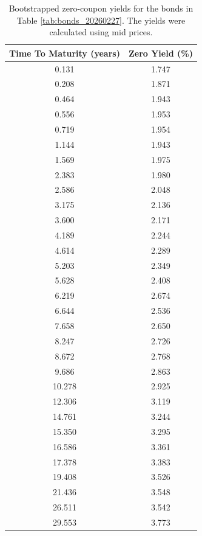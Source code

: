 \documentclass[a4paper]{artikel3}
\numberwithin{equation}{section}
\numberwithin{theorem}{section}
\numberwithin{proposition}{section}
\numberwithin{lemma}{section}
\begin{document}
\begin{table}[h!]
    \centering
    \begin{tabular}{| c | c |} 
\hline
Time To Maturity (years) & Zero Yield (\%) \\
\hline
\hline
0.131 & 1.747 \\
\hline
0.208 & 1.871 \\
\hline
0.464 & 1.943 \\
\hline
0.556 & 1.953 \\
\hline
0.719 & 1.954 \\
\hline
1.144 & 1.943 \\
\hline
1.569 & 1.975 \\
\hline
2.383 & 1.980 \\
\hline
2.586 & 2.048 \\
\hline
3.175 & 2.136 \\
\hline
3.600 & 2.171 \\
\hline
4.189 & 2.244 \\
\hline
4.614 & 2.289 \\
\hline
5.203 & 2.349 \\
\hline
5.628 & 2.408 \\
\hline
6.219 & 2.674 \\
\hline
6.644 & 2.536 \\
\hline
7.658 & 2.650 \\
\hline
8.247 & 2.726 \\
\hline
8.672 & 2.768 \\
\hline
9.686 & 2.863 \\
\hline
10.278 & 2.925 \\
\hline
12.306 & 3.119 \\
\hline
14.761 & 3.244 \\
\hline
15.350 & 3.295 \\
\hline
16.586 & 3.361 \\
\hline
17.378 & 3.383 \\
\hline
19.408 & 3.526 \\
\hline
21.436 & 3.548 \\
\hline
26.511 & 3.542 \\
\hline
29.553 & 3.773 \\
\hline
    \end{tabular}
    \caption{Bootstrapped zero-coupon yields for the bonds in Table \ref{tab:bonds_20260227}. The yields were calculated using mid prices.}
    \label{tab:yields_20260227}
\end{table}
\end{document}
